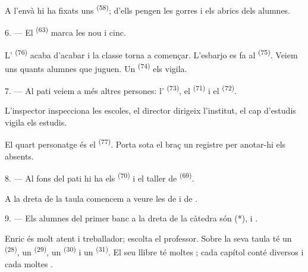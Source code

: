 A l'envà hi ha fixats uns  \textsuperscript{(58)}; d'ells
pengen les gorres i els abrics dels alumnes.

\VUsaut{5.2mm}
\VUsaut{3.6mm}

6. --- El  \textsuperscript{(63)} marca les nou i cinc.

L' \textsuperscript{(76)} acaba d'acabar i la classe torna a
començar. L'esbarjo es fa al  \textsuperscript{(75)}. Veiem uns
quants alumnes que juguen. Un  \textsuperscript{(74)} els
vigila.

7. --- Al pati veiem a més altres persones: l'
\textsuperscript{(73)}, el  \textsuperscript{(71)} i el
 \textsuperscript{(72)}.

L'inspector inspecciona les escoles, el director dirigeix l'institut, el cap
d'estudis vigila els estudis.

El quart personatge és el  \textsuperscript{(77)}. Porta sota el
braç un registre per anotar-hi els absents.

8. --- Al fons del pati hi ha els 
\textsuperscript{(70)} i el taller de 
\textsuperscript{(69)}.

A la dreta de la taula comencem a veure les  de  i
de .


\VUsaut{2.4mm}

\VUsaut{3.0mm}

9. --- Els alumnes del primer banc a la dreta de la càtedra són 
(*),  i .

Enric és molt atent i treballador; escolta el professor. Sobre la seva taula té
un  \textsuperscript{(28)}, un 
\textsuperscript{(29)}, un  \textsuperscript{(30)} i un
 \textsuperscript{(31)}. El seu llibre té moltes
; cada capítol conté diversos  i cada
 moltes .

